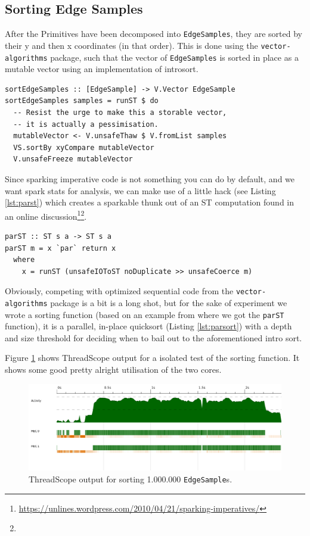 \documentclass[12pt, a4paper]{article}
\begin{document}
\subsection{Sorting Edge Samples}\label{sec:sorting}

After the Primitives have been decomposed into \texttt{EdgeSamples}, they are sorted by their y and then x coordinates (in that order).
This is done using the \texttt{vector-algorithms} package, such that the vector of \texttt{EdgeSamples} is sorted in place as a mutable vector
 using an implementation of introsort.
\begin{lstlisting}[caption={Sorting the edge samples.}]
sortEdgeSamples :: [EdgeSample] -> V.Vector EdgeSample
sortEdgeSamples samples = runST $ do
  -- Resist the urge to make this a storable vector,
  -- it is actually a pessimisation.
  mutableVector <- V.unsafeThaw $ V.fromList samples
  VS.sortBy xyCompare mutableVector
  V.unsafeFreeze mutableVector
\end{lstlisting}

Since sparking imperative code is not something you can do by default, and we want spark stats for
analysis, we can make use of a little hack (see Listing \ref{lst:parst}) which creates a sparkable
 thunk out of an ST computation found in an online discussion\footnote{\label{note1}\url{https://unlines.wordpress.com/2010/04/21/sparking-imperatives/}}\footnote{}.
\begin{lstlisting}[label={lst:parst}, caption={\texttt{parST}}]
parST :: ST s a -> ST s a
parST m = x `par` return x
  where
    x = runST (unsafeIOToST noDuplicate >> unsafeCoerce m)
\end{lstlisting}
Obviously, competing with optimized sequential code from the \texttt{vector-algorithms} package is a
 bit is a long shot, but for the sake of experiment we wrote a sorting function (based on an example from where we got the \texttt{parST} function),
 it is a parallel, in-place quicksort (Listing \ref{lst:parsort}) with a depth and size threshold for deciding when to bail out to the aforementioned intro sort.

 Figure \ref{fig:sorting-thread} shows ThreadScope output for a isolated test of the sorting function.
 It shows some good pretty alright utilisation of the two cores.

 \begin{figure}[h!]
  \centering
  \includegraphics[width=0.85\linewidth]{../threadscope/sorting/sorting-final}
  \caption{ThreadScope output for sorting 1.000.000 \texttt{EdgeSample}s.}
  \label{fig:sorting-thread}
\end{figure}
\end{document}
